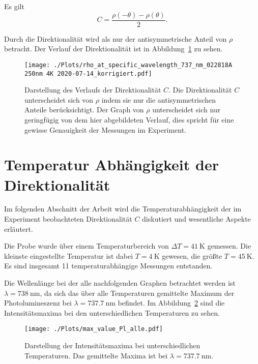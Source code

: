 Es gilt 
\begin{equation}
    C= \frac{\rho(-\theta)-\rho(\theta)}{2}.
    \label{eq:C} 
\end{equation}

Durch die Direktionalität wird als nur der antisymmetrische Anteil von $\rho$ betracht.
Der Verlauf der Direktionalität ist in Abbildung~\ref{fig:dir_kor} zu sehen.
\begin{figure}
    \centering
    \texttt{[image: ./Plots/rho\_at\_specific\_wavelength\_737\_nm\_022818A 250nm 4K 2020-07-14\_korrigiert.pdf]}
    \caption{Darstellung des Verlaufs der Direktionalität $C$.
     Die Direktionalität $C$ unterscheidet sich von $\rho$ indem sie nur die antisymmetrischen
     Anteile berücksichtigt. Der Graph von $\rho$ unterscheidet sich nur geringfügig von dem hier 
     abgebildeten Verlauf, dies spricht für eine gewisse Genauigkeit der Messungen im Experiment. }
    \label{fig:dir_kor}
\end{figure}
\FloatBarrier


\section{Temperatur Abhängigkeit der Direktionalität}
Im folgenden Abschnitt der Arbeit wird die Temperaturabhängigkeit der im Experiment
beobachteten Direktionalität $C$ diskutiert und wesentliche Aspekte erläutert.

Die Probe wurde über einem Temperaturbereich von $ \Delta T =\SI{41}{\kelvin} $ gemessen.
Die kleinste eingestellte Temperatur ist dabei $T =\SI{4}{\kelvin}$ gewesen, die größte 
$T =\SI{45}{\kelvin}$.
Es sind insgesamt 11 temperaturabhängige Messungen entstanden.

Die Wellenlänge bei der alle nachfolgenden Graphen betrachtet werden ist $\lambda =\SI{738}{\nano\meter}$,
da sich das über alle Temperaturen gemittelte Maximum der Photolumineszenz bei
$\lambda =\SI{737,7}{\nano\meter}$ befindet.
Im Abbildung~\ref{fig:int_temp} sind die Intensitätsmaxima bei den unterschiedlichen Temperaturen zu sehen.
\begin{figure}
    \centering
    \texttt{[image: ./Plots/max\_value\_Pl\_alle.pdf]}
    \caption{Darstellung der Intensitätsmaxima bei unterschiedlichen Temperaturen.
    Das gemittelte Maxima ist bei $\lambda =\SI{737,7}{\nano\meter}$.}
    \label{fig:int_temp}
\end{figure}
\FloatBarrier 

